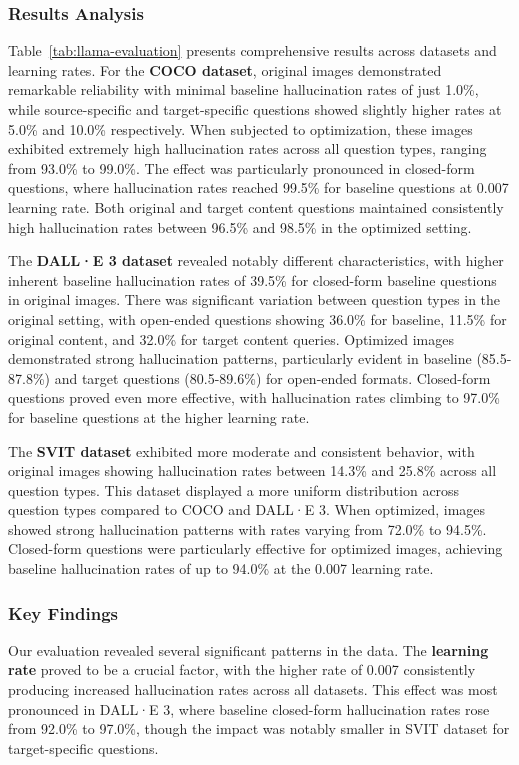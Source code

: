 \documentclass[runningheads]{llncs}
\begin{document}
\subsubsection{Results Analysis}
Table~\ref{tab:llama-evaluation} presents comprehensive results across datasets and learning rates. For the \textbf{COCO dataset}, original images demonstrated remarkable reliability with minimal baseline hallucination rates of just 1.0\%, while source-specific and target-specific questions showed slightly higher rates at 5.0\% and 10.0\% respectively. When subjected to optimization, these images exhibited extremely high hallucination rates across all question types, ranging from 93.0\% to 99.0\%. The effect was particularly pronounced in closed-form questions, where hallucination rates reached 99.5\% for baseline questions at 0.007 learning rate. Both original and target content questions maintained consistently high hallucination rates between 96.5\% and 98.5\% in the optimized setting.

The \textbf{DALL·E 3 dataset} revealed notably different characteristics, with higher inherent baseline hallucination rates of 39.5\% for closed-form baseline questions in original images. There was significant variation between question types in the original setting, with open-ended questions showing 36.0\% for baseline, 11.5\% for original content, and 32.0\% for target content queries. Optimized images demonstrated strong hallucination patterns, particularly evident in baseline (85.5-87.8\%) and target questions (80.5-89.6\%) for open-ended formats. Closed-form questions proved even more effective, with hallucination rates climbing to 97.0\% for baseline questions at the higher learning rate.

The \textbf{SVIT dataset} exhibited more moderate and consistent behavior, with original images showing hallucination rates between 14.3\% and 25.8\% across all question types. This dataset displayed a more uniform distribution across question types compared to COCO and DALL·E 3. When optimized, images showed strong hallucination patterns with rates varying from 72.0\% to 94.5\%. Closed-form questions were particularly effective for optimized images, achieving baseline hallucination rates of up to 94.0\% at the 0.007 learning rate.

\subsubsection{Key Findings}
Our evaluation revealed several significant patterns in the data. The \textbf{learning rate} proved to be a crucial factor, with the higher rate of 0.007 consistently producing increased hallucination rates across all datasets. This effect was most pronounced in DALL·E 3, where baseline closed-form hallucination rates rose from 92.0\% to 97.0\%, though the impact was notably smaller in SVIT dataset for target-specific questions.
\end{document}
